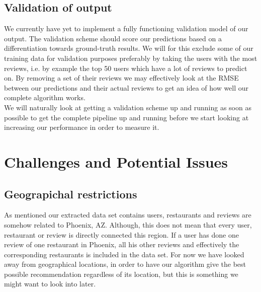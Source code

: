 \documentclass[10pt,twocolumn,letterpaper]{article}
\begin{document}
\subsection{Validation of output}
We currently have yet to implement a fully functioning validation model of our output. The validation scheme should score our predictions based on a differentiation towards ground-truth results. We will for this exclude some of our training data for validation purposes preferably by taking the users with the most reviews, i.e. by example the top 50 users which have a lot of reviews to predict on. By removing a set of their reviews we may effectively look at the RMSE between our predictions and their actual reviews to get an idea of how well our complete algorithm works.
\\[.5em]
\indent We will naturally look at getting a validation scheme up and running as soon as possible to get the complete pipeline up and running before we start looking at increasing our performance in order to measure it.

\section{Challenges and Potential Issues}
\subsection{Geograpichal restrictions}
As mentioned our extracted data set contains users, restaurants and reviews are somehow related to Phoenix, AZ. Although, this does not mean that every user, restaurant or review is directly connected this region. If a user has done one review of one restaurant in Phoenix, all his other reviews and effectively the corresponding restaurants is included in the data set. For now we have looked away from geographical locations, in order to have our algorithm give the best possible recommendation regardless of its location, but this is something we might want to look into later.

{\small

}
\end{document}
